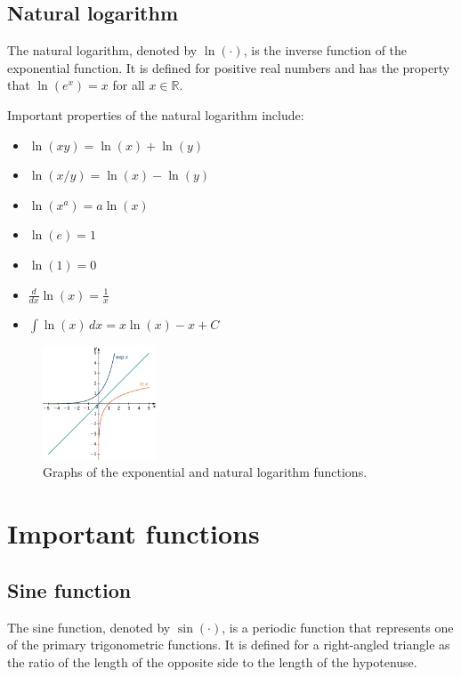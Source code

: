 \documentclass[11pt]{book} %
\begin{document}
\subsection{Natural logarithm}
The natural logarithm, denoted by \(\ln(\cdot)\), is the inverse function of the exponential function. 
It is defined for positive real numbers and has the property that \(\ln(e^x) = x\) for all \(x \in \mathbb{R}\).

Important properties of the natural logarithm include:
\begin{itemize}
    \item \(\ln(xy) = \ln(x) + \ln(y)\)
    \item \(\ln(x/y) = \ln(x) - \ln(y)\)
    \item \(\ln(x^a) = a \ln(x)\)
    \item \(\ln(e) = 1\)
    \item \(\ln(1) = 0\)
    \item $\frac{d}{dx} \ln(x) = \frac{1}{x}$
    \item $\int \ln(x) \, dx = x \ln(x) - x + C$
\end{itemize}

\begin{figure}[h]
    \centering
    \includegraphics[width=0.3\textwidth]{Figs/exp_and_log.jpeg}
    \caption{Graphs of the exponential and natural logarithm functions.}
    \label{fig:exp_log}
\end{figure}


\section{Important functions}

\subsection{Sine function}
The sine function, denoted by \(\sin(\cdot)\), is a periodic function that represents one of the primary trigonometric functions.
It is defined for a right-angled triangle as the ratio of the length of the opposite side to the length of the hypotenuse.
\end{document}
